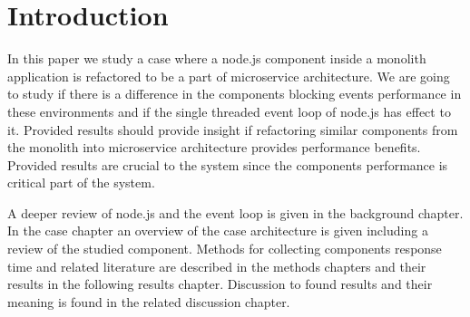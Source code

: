 \chapter{Introduction\label{intro}}

In this paper we study a case where a node.js component inside a monolith application is refactored to be a part of microservice architecture.
We are going to study if there is a difference in the components blocking events performance in these environments and if the single threaded event loop of node.js has effect to it.
Provided results should provide insight if refactoring similar components from the monolith into microservice architecture provides performance benefits.
Provided results are crucial to the system since the components performance is critical part of the system.

A deeper review of node.js and the event loop is given in the background chapter.
In the case chapter an overview of the case architecture is given including a review of the studied component.
Methods for collecting components response time and related literature are described in the methods chapters and their results in the following results chapter.
Discussion to found results and their meaning is found in the related discussion chapter.

